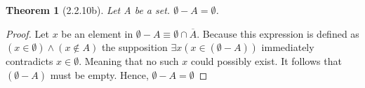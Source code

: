 \documentclass[a4paper, 12pt]{article}
\theoremstyle{plain}
\newtheorem*{theorem*}{Theorem}
\begin{document}
	
	\begin{theorem*}[2.2.10b]
		Let A be a set. $\emptyset - A = \emptyset$.
	\end{theorem*}
	
	\begin{proof}
		Let $x$ be an element in $\emptyset - A \equiv \emptyset \cap \overline{A}$. Because this expression is defined as $(x \in \emptyset) \land (x \notin A)$ the supposition $\exists x (x \in (\emptyset - A))$ immediately contradicts $x \in \emptyset$. Meaning that no such $x$ could possibly exist. It follows that $(\emptyset - A)$ must be empty. Hence, $\emptyset - A = \emptyset$
	\end{proof}
\end{document}
